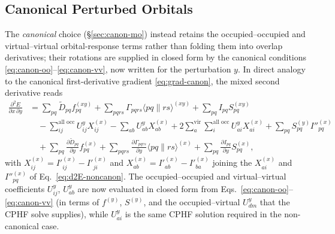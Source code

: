 \documentclass[12pt]{article}
\newcommand{\adb}[2]{\langle #1 \| #2 \rangle}
\newcommand{\vir}{\text{vir}}
\newcommand{\alloc}{\text{all occ}}   %
\begin{document}
\subsection{Canonical Perturbed Orbitals}
\label{sec:2nd-canon}

The {\em canonical} choice (\S\ref{sec:canon-mo}) instead retains the occupied--occupied and
virtual--virtual orbital-response terms rather than folding them into overlap
derivatives; their rotations are supplied in closed form by the canonical
conditions \eqref{eq:canon-oo}--\eqref{eq:canon-vv}, now written for the
perturbation $y$.  In direct analogy to the canonical first-derivative gradient
\eqref{eq:grad-canon}, the mixed second derivative reads
\begin{align}
\frac{\partial^2 E}{\partial x\,\partial y}
&= \sum_{pq}\tilde D_{pq} f^{(xy)}_{pq}
+ \sum_{pqrs}\Gamma_{pqrs}\adb{pq}{rs}^{(xy)}
+ \sum_{pq} I_{pq} S^{(xy)}_{pq}
\nonumber\\
&\quad
- \sum_{ij}^{\alloc} U^y_{ij} X^{(x)}_{ij}
- \sum_{ab} U^y_{ab} X^{(x)}_{ab}
+ 2\sum_{a}^{\vir}\sum_{i}^{\alloc} U^y_{ai} X^{(x)}_{ai}
+ \sum_{pq} S^{(y)}_{pq} I''^{(x)}_{pq}
\nonumber\\
&\quad
+ \sum_{pq}\frac{\partial \tilde D_{pq}}{\partial y} f^{(x)}_{pq}
+ \sum_{pqrs}\frac{\partial \Gamma_{pqrs}}{\partial y}\adb{pq}{rs}^{(x)}
+ \sum_{pq}\frac{\partial I_{pq}}{\partial y} S^{(x)}_{pq},
\label{eq:d2E-canon}
\end{align}
with $X^{(x)}_{ij}=I'^{(x)}_{ij}-I'^{(x)}_{ji}$ and
$X^{(x)}_{ab}=I'^{(x)}_{ab}-I'^{(x)}_{ba}$ joining the $X^{(x)}_{ai}$ and
$I''^{(x)}_{pq}$ of Eq.~\eqref{eq:d2E-noncanon}.  The occupied--occupied and
virtual--virtual coefficients $U^y_{ij}$, $U^y_{ab}$ are now evaluated in closed
form from Eqs.~\eqref{eq:canon-oo}--\eqref{eq:canon-vv} (in terms of $f^{(y)}$,
$S^{(y)}$, and the occupied--virtual $U^y_{dm}$ that the CPHF solve supplies),
while $U^y_{ai}$ is the same CPHF solution required in the non-canonical case.
\end{document}
